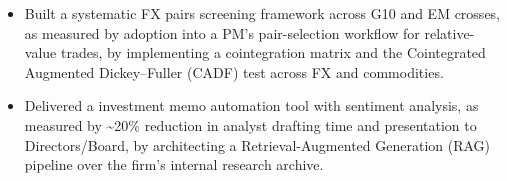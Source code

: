 \documentclass{article}
\begin{document}
\begin{itemize}
  \item Built a systematic FX pairs screening framework across G10 and EM crosses, as measured by adoption into a PM's pair-selection workflow for relative-value trades, by implementing a cointegration matrix and the Cointegrated Augmented Dickey--Fuller (CADF) test across FX and commodities.
  \item Delivered a  investment memo automation tool with sentiment analysis, as measured by \textasciitilde{}20\% reduction in analyst drafting time and presentation to Directors/Board, by architecting a Retrieval-Augmented Generation (RAG) pipeline over the firm's internal research archive.
\end{itemize}

\begin{cvskills}
\end{cvskills}
\end{document}
